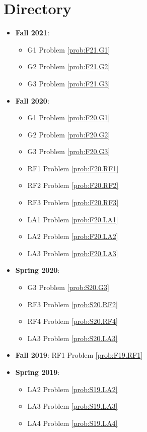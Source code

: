 \documentclass{article}
\theoremstyle{definition}
\begin{document}
\tableofcontents

\section{Directory}

\begin{itemize}
	\item \textbf{Fall 2021}:
	\begin{itemize}
	\item G1 Problem \ref{prob:F21.G1} 
	\item G2 Problem \ref{prob:F21.G2}
	\item G3 Problem \ref{prob:F21.G3}
	\end{itemize}
	\item \textbf{Fall 2020}:
	\begin{itemize}
		\item G1 Problem \ref{prob:F20.G1} 
		\item G2 Problem \ref{prob:F20.G2}
		\item G3 Problem \ref{prob:F20.G3}
		\item RF1 Problem \ref{prob:F20.RF1}
		\item RF2 Problem \ref{prob:F20.RF2}
		\item RF3 Problem \ref{prob:F20.RF3}
		\item LA1 Problem \ref{prob:F20.LA1}
		\item LA2 Problem \ref{prob:F20.LA2}
		\item LA3 Problem \ref{prob:F20.LA3}	
	\end{itemize}
	\item \textbf{Spring 2020}:
	\begin{itemize}
		\item G3 Problem \ref{prob:S20.G3}
		\item RF3 Problem \ref{prob:S20.RF2}
		\item RF4 Problem \ref{prob:S20.RF4}
		\item LA3 Problem \ref{prob:S20.LA3}	
	\end{itemize}
	\item \textbf{Fall 2019}: RF1 Problem \ref{prob:F19.RF1}
	\item \textbf{Spring 2019}:
	\begin{itemize}
		\item LA2 Problem \ref{prob:S19.LA2}
		\item LA3 Problem \ref{prob:S19.LA3}
		\item LA4 Problem \ref{prob:S19.LA4}	
	\end{itemize}

\end{itemize}
\end{document}
